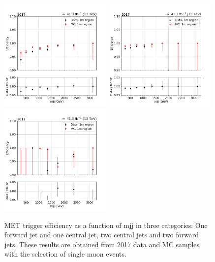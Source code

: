 \begin{figure}[htp]
    \begin{center}
        \includegraphics[width=0.49\textwidth]{fig/efficiency/trigger/met/mjj/data_mc_comparison_1m_2017_one_jet_forward_one_jet_central.png}
        \includegraphics[width=0.49\textwidth]{fig/efficiency/trigger/met/mjj/data_mc_comparison_1m_2017_two_central_jets.png} \\
        \includegraphics[width=0.49\textwidth]{fig/efficiency/trigger/met/mjj/data_mc_comparison_1m_2017_two_forward_jets.png}
    \end{center}
    \caption{MET trigger efficiency as a function of mjj in three categories: One forward jet and one central jet, two central jets and
            two forward jets. These results are obtained from 2017 data and MC samples with the selection of single muon events.}
    \label{fig:eff_mjj_2017_1m}
\end{figure}


